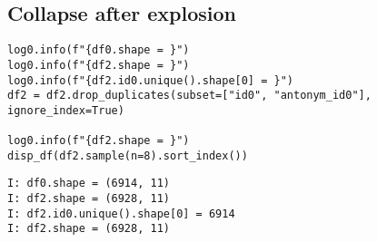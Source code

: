 \documentclass[a4paper,10pt,onecolumn,oneside,openright]{article}
\begin{document}
\subsection{Collapse after explosion}
\label{sec:orgd346eaf}
\begin{verbatim}
log0.info(f"{df0.shape = }")
log0.info(f"{df2.shape = }")
log0.info(f"{df2.id0.unique().shape[0] = }")
df2 = df2.drop_duplicates(subset=["id0", "antonym_id0"], ignore_index=True)

log0.info(f"{df2.shape = }")
disp_df(df2.sample(n=8).sort_index())
\end{verbatim}

\begin{verbatim}
I: df0.shape = (6914, 11)
I: df2.shape = (6928, 11)
I: df2.id0.unique().shape[0] = 6914
I: df2.shape = (6928, 11)
\end{verbatim}
\end{document}
